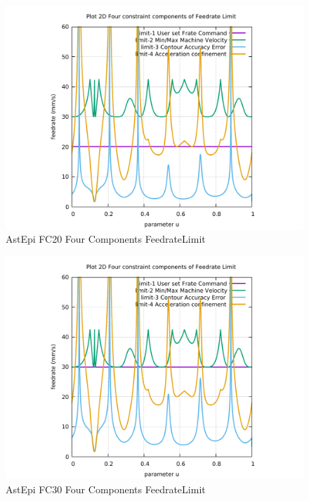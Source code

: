 \begin{figure}
	\caption     {AstEpi FC20 Four Components FeedrateLimit}
	\label{32-img-AstEpi-FC20-Four-Components-FeedrateLimit.pdf}
\includegraphics[width=1.00\textwidth]{Chap4/appendix/app-AstEpi/plots/32-img-AstEpi-FC20-Four-Components-FeedrateLimit.pdf}
\end{figure}


\clearpage
\pagebreak

\begin{figure}
	\caption     {AstEpi FC30 Four Components FeedrateLimit}
	\label{33-img-AstEpi-FC30-Four-Components-FeedrateLimit.pdf}
\includegraphics[width=1.00\textwidth]{Chap4/appendix/app-AstEpi/plots/33-img-AstEpi-FC30-Four-Components-FeedrateLimit.pdf}
\end{figure}


